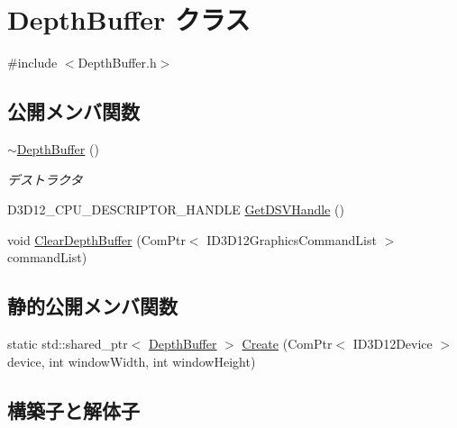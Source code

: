 \hypertarget{class_depth_buffer}{}\section{Depth\+Buffer クラス}
\label{class_depth_buffer}


{\ttfamily \#include $<$Depth\+Buffer.\+h$>$}

\subsection*{公開メンバ関数}
\begin{DoxyCompactItemize}
\item 
\mbox{\hyperlink{class_depth_buffer_a9d04ef2a88a2414d476f4fc27a25a7a8}{$\sim$\+Depth\+Buffer}} ()
\begin{DoxyCompactList}\small\item\em デストラクタ \end{DoxyCompactList}\item 
D3\+D12\+\_\+\+C\+P\+U\+\_\+\+D\+E\+S\+C\+R\+I\+P\+T\+O\+R\+\_\+\+H\+A\+N\+D\+LE \mbox{\hyperlink{class_depth_buffer_abc91e9fea6125161ebbc5215f783374d}{Get\+D\+S\+V\+Handle}} ()
\item 
void \mbox{\hyperlink{class_depth_buffer_a673f6120808ac749fe900b21b6361bce}{Clear\+Depth\+Buffer}} (Com\+Ptr$<$ I\+D3\+D12\+Graphics\+Command\+List $>$ command\+List)
\end{DoxyCompactItemize}
\subsection*{静的公開メンバ関数}
\begin{DoxyCompactItemize}
\item 
static std\+::shared\+\_\+ptr$<$ \mbox{\hyperlink{class_depth_buffer}{Depth\+Buffer}} $>$ \mbox{\hyperlink{class_depth_buffer_a1c465b15498fc12a41662562cde74b83}{Create}} (Com\+Ptr$<$ I\+D3\+D12\+Device $>$ device, int window\+Width, int window\+Height)
\end{DoxyCompactItemize}


\subsection{構築子と解体子}
\mbox{\label{class_depth_buffer_a9d04ef2a88a2414d476f4fc27a25a7a8}} 
